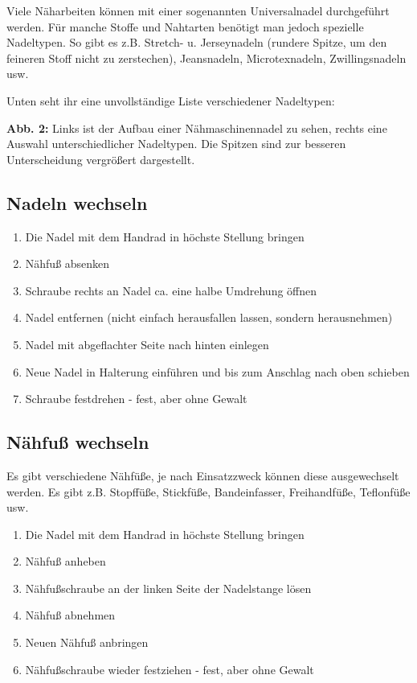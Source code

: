 \documentclass{\basedir/fablab-document}
\begin{document}
Viele Näharbeiten können mit einer sogenannten Universalnadel durchgeführt werden. Für manche Stoffe und Nahtarten benötigt man jedoch spezielle Nadeltypen.
So gibt es z.B. Stretch- u. Jerseynadeln (rundere Spitze, um den feineren Stoff nicht zu zerstechen), Jeansnadeln, Microtexnadeln, Zwillingsnadeln usw.
\newline


Unten seht ihr eine unvollständige Liste verschiedener Nadeltypen:
\begin{center}
	\resizebox{0.88\linewidth}{!}{}
	\par{\small \textbf{Abb. 2:} Links ist der Aufbau einer Nähmaschinennadel zu sehen, rechts eine Auswahl unterschiedlicher Nadeltypen. Die Spitzen sind zur besseren Unterscheidung vergrößert dargestellt.}
\end{center}

\subsection{Nadeln wechseln}
\begin{enumerate}
	\item Die Nadel mit dem Handrad in höchste Stellung bringen
	\item Nähfuß absenken
	\item Schraube rechts an Nadel ca. eine halbe Umdrehung öffnen
	\item Nadel entfernen (nicht einfach herausfallen lassen, sondern herausnehmen)
	\item Nadel mit abgeflachter Seite nach hinten einlegen
	\item Neue Nadel in Halterung einführen und bis zum Anschlag nach oben schieben
	\item Schraube festdrehen - fest, aber ohne Gewalt
\end{enumerate}

\subsection{Nähfuß wechseln}
Es gibt verschiedene Nähfüße, je nach Einsatzzweck können diese ausgewechselt werden. Es gibt z.B. Stopffüße, Stickfüße, Bandeinfasser, Freihandfüße, Teflonfüße usw.

\begin{enumerate}
	\item Die Nadel mit dem Handrad in höchste Stellung bringen
	\item Nähfuß anheben
	\item Nähfußschraube an der linken Seite der Nadelstange lösen
	\item Nähfuß abnehmen
	\item Neuen Nähfuß anbringen
	\item Nähfußschraube wieder festziehen - fest, aber ohne Gewalt
\end{enumerate}
\end{document}
